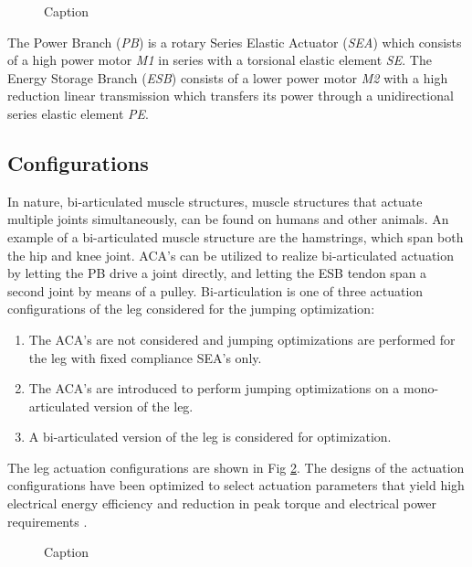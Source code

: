 \documentclass[letterpaper, 10 pt, conference]{ieeeconf}  %
\begin{document}
\begin{figure}[b]
	\centering
	\caption{Caption}
	\label{fig:ACA}
\end{figure}

 The Power Branch (\textit{PB}) is a rotary Series Elastic Actuator (\textit{SEA}) which consists of a high power motor \textit{M1} in series with a torsional elastic element \textit{SE}. The Energy Storage Branch (\textit{ESB}) consists of a lower power motor \textit{M2} with a high reduction linear transmission which transfers its power through a unidirectional series elastic element \textit{PE}.

\subsection{Configurations}
In nature, bi-articulated muscle structures, muscle structures that actuate multiple joints simultaneously, can be found on humans and other animals. An example of a bi-articulated muscle structure are the hamstrings, which span both the hip and knee joint. ACA's can be utilized to realize bi-articulated actuation by letting the PB drive a joint directly, and letting the ESB tendon span a second joint by means of a pulley. Bi-articulation is one of three actuation configurations of the leg considered for the jumping optimization:

  \begin{enumerate}
	\item The ACA's are not considered and jumping optimizations are performed for the leg with fixed compliance SEA's only.
	\item The ACA's are introduced to perform jumping optimizations on a mono-articulated version of the leg. 
	\item A bi-articulated version of the leg is considered for optimization.
\end{enumerate}
The leg actuation configurations are shown in Fig \ref{fig:configurations}. The designs of the actuation configurations have been optimized to select actuation
parameters that yield high electrical energy efficiency and reduction in peak torque and electrical power requirements \cite{roozing2016design}.

\begin{figure}[b]
	\centering
	\caption{Caption}
	\label{fig:configurations}
\end{figure}
\end{document}
